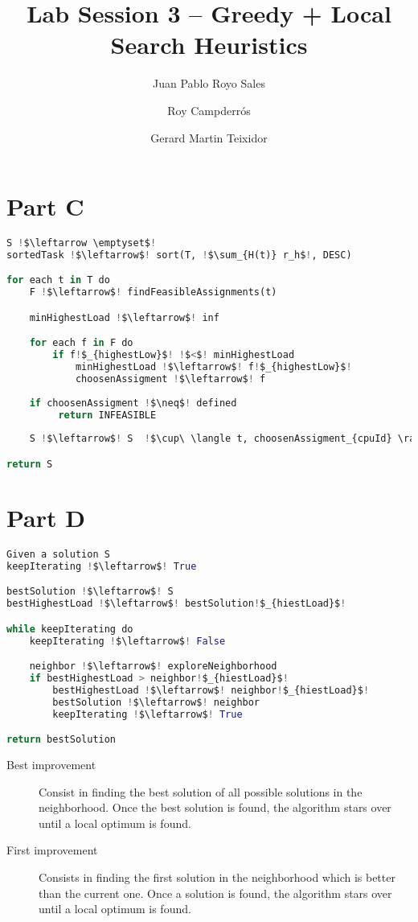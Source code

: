 \documentclass{article}
\title{Lab Session 3 – Greedy + Local Search Heuristics}
\author{Juan Pablo Royo Sales \and Roy Campderrós \and Gerard Martin Teixidor}
\begin{document}
\maketitle

\section{Part C}
\begin{lstlisting}[language=Python]
S !$\leftarrow \emptyset$!
sortedTask !$\leftarrow$! sort(T, !$\sum_{H(t)} r_h$!, DESC)

for each t in T do
    F !$\leftarrow$! findFeasibleAssignments(t)

    minHighestLoad !$\leftarrow$! inf

    for each f in F do
        if f!$_{highestLow}$! !$<$! minHighestLoad  
            minHighestLoad !$\leftarrow$! f!$_{highestLow}$!
            choosenAssigment !$\leftarrow$! f
 
    if choosenAssigment !$\neq$! defined
         return INFEASIBLE
      
    S !$\leftarrow$! S  !$\cup\ \langle t, choosenAssigment_{cpuId} \rangle$!

return S
\end{lstlisting}

\section{Part D}
\begin{lstlisting}[language=Python]
Given a solution S
keepIterating !$\leftarrow$! True

bestSolution !$\leftarrow$! S
bestHighestLoad !$\leftarrow$! bestSolution!$_{hiestLoad}$!

while keepIterating do
    keepIterating !$\leftarrow$! False

    neighbor !$\leftarrow$! exploreNeighborhood
    if bestHighestLoad > neighbor!$_{hiestLoad}$!
        bestHighestLoad !$\leftarrow$! neighbor!$_{hiestLoad}$!
        bestSolution !$\leftarrow$! neighbor
        keepIterating !$\leftarrow$! True

return bestSolution
\end{lstlisting}

\begin{description}
\item[Best improvement] Consist in finding the best solution of all possible solutions in the  neighborhood. Once the best solution is found, the algorithm stars over until a local optimum is found.

\item[First improvement] Consists in finding the first solution in the neighborhood which is better than the current one. Once a solution is found, the algorithm stars over until a local optimum is found.
\end{description}
\end{document}
